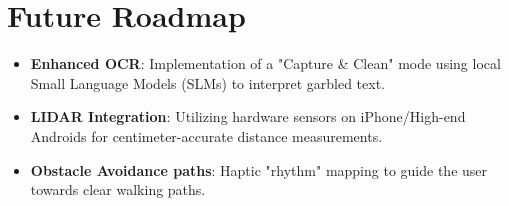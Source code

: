 \documentclass[12pt]{article}
\begin{document}
\section{Future Roadmap}
\begin{itemize}
    \item \textbf{Enhanced OCR}: Implementation of a "Capture \& Clean" mode using local Small Language Models (SLMs) to interpret garbled text.
    \item \textbf{LIDAR Integration}: Utilizing hardware sensors on iPhone/High-end Androids for centimeter-accurate distance measurements.
    \item \textbf{Obstacle Avoidance paths}: Haptic "rhythm" mapping to guide the user towards clear walking paths.
\end{itemize}
\end{document}
